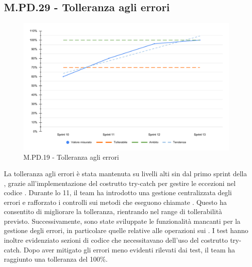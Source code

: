 \subsection{M.PD.29 - Tolleranza agli errori}

\begin{figure}[H]
  \centering
  \includegraphics[width=\textwidth]{assets/tolleranza_errori.pdf}
  \caption{M.PD.19 - Tolleranza agli errori}
\end{figure}

\par La tolleranza agli errori è stata mantenuta su livelli alti sin dal primo sprint della , grazie all'implementazione del costrutto try-catch per gestire le eccezioni nel codice . Durante lo  11, il team ha introdotto una gestione centralizzata degli errori e rafforzato i controlli sui metodi che eseguono chiamate . Questo ha consentito di migliorare la tolleranza, rientrando nel range di tollerabilità previsto. Successivamente, sono state sviluppate le funzionalità mancanti per la gestione degli errori, in particolare quelle relative alle operazioni  sui . I test hanno inoltre evidenziato sezioni di codice che necessitavano dell'uso del costrutto try-catch. Dopo aver mitigato gli errori meno evidenti rilevati dai test, il team ha raggiunto una tolleranza del 100\%.
